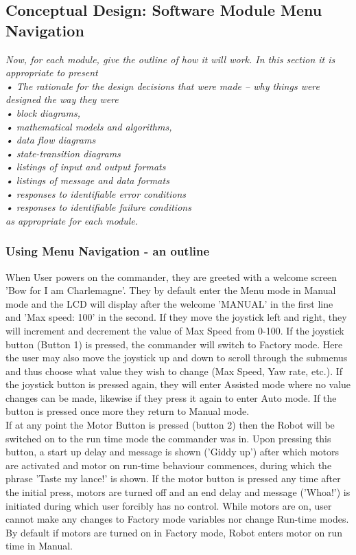 \documentclass{article}
\begin{document}
	\subsection{Conceptual Design: Software Module Menu Navigation}
\textit{	Now, for each module, give the outline of how it will work. In this section it is appropriate to present \\
	•	The rationale for the design decisions that were made – why things were designed the way they were\\
	•	block diagrams,\\
	•	mathematical models and algorithms,\\
	•	data flow diagrams\\
	•	state-transition diagrams\\
	•	listings of input and output formats\\
	•	listings of message and data formats\\
	•	responses to identifiable error conditions\\
	•	responses to identifiable failure conditions\\
	as appropriate for each module.}
	
	\subsubsection{Using Menu Navigation - an outline}
	When User powers on the commander, they are greeted with a welcome screen 'Bow for I am Charlemagne'. They by default enter the Menu mode in Manual mode and the LCD will display after the welcome 'MANUAL' in the first line and 'Max speed: 100' in the second. If they move the joystick left and right, they will increment and decrement the value of Max Speed from 0-100. If the joystick button (Button 1) is pressed, the commander will switch to Factory mode. Here the user may also move the joystick up and down to scroll through the submenus and thus choose what value they wish to change (Max Speed, Yaw rate, etc.). If the joystick button is pressed again, they will enter Assisted mode where no value changes can be made, likewise if they press it again to enter Auto mode. If the button is pressed once more they return to Manual mode.\\
	
	If at any point the Motor Button is pressed (button 2) then the Robot will be switched on to the run time mode the commander was in. Upon pressing this button, a start up delay and message is shown ('Giddy up') after which motors are activated and motor on run-time behaviour commences, during which the phrase 'Taste my lance!' is shown. If the motor button is pressed any time after the initial press, motors are turned off and an end delay and message ('Whoa!') is initiated during which user forcibly has no control. While motors are on, user cannot make any changes to Factory mode variables nor change Run-time modes. By default if motors are turned on in Factory mode, Robot enters motor on run time in Manual.
	
\end{document}
